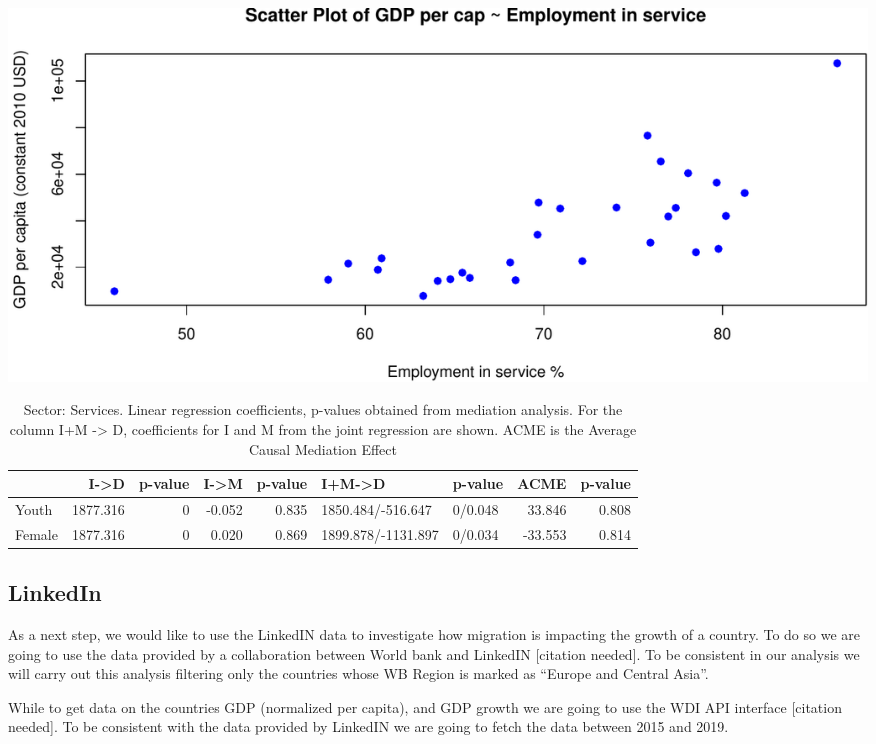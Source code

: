 \documentclass[
]{article}
\begin{document}
\includegraphics{main_files/figure-latex/mediation_ser-1.pdf}

\begin{table}

\caption{\label{tab:mediation_ser}Sector: Services. Linear regression coefficients, p-values obtained from mediation analysis. For the column I+M -> D, coefficients for I and M from the joint regression are shown. ACME is the Average Causal Mediation Effect}
\centering
\begin{tabular}[t]{l|r|r|r|r|l|l|r|r}
\hline
  & I->D & p-value & I->M & p-value & I+M->D & p-value & ACME & p-value\\
\hline
Youth & 1877.316 & 0 & -0.052 & 0.835 & 1850.484/-516.647 & 0/0.048 & 33.846 & 0.808\\
\hline
Female & 1877.316 & 0 & 0.020 & 0.869 & 1899.878/-1131.897 & 0/0.034 & -33.553 & 0.814\\
\hline
\end{tabular}
\end{table}

\hypertarget{linkedin}{%
\subsection{LinkedIn}\label{linkedin}}

As a next step, we would like to use the LinkedIN data to investigate
how migration is impacting the growth of a country. To do so we are
going to use the data provided by a collaboration between World bank and
LinkedIN {[}citation needed{]}. To be consistent in our analysis we will
carry out this analysis filtering only the countries whose WB Region is
marked as ``Europe and Central Asia''.

While to get data on the countries GDP (normalized per capita), and GDP
growth we are going to use the WDI API interface {[}citation needed{]}.
To be consistent with the data provided by LinkedIN we are going to
fetch the data between 2015 and 2019.
\end{document}
